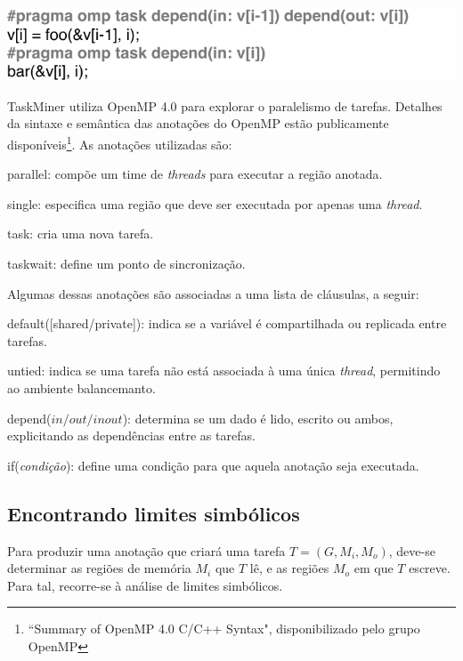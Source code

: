 \documentclass[sigplan,10pt,review]{acmart}
\newcommand\Taskminer{\mbox{\textsf{TaskMiner}}}
\begin{document}
\includegraphics[width=1\columnwidth]{images/ex_depends}

{\Taskminer} utiliza OpenMP 4.0 para explorar o paralelismo de tarefas. Detalhes da sintaxe e semântica
das anotações do OpenMP estão publicamente disponíveis\footnote{``Summary of OpenMP 4.0 C/C++ Syntax", disponibilizado
pelo grupo OpenMP}. As anotações utilizadas são:
%
\begin{compactitem}
\item \textsf{parallel}: compõe um time de \textit{threads}
para executar a região anotada.
\item \textsf{single}: especifica uma região que deve ser executada
por apenas uma \textit{thread}.
\item \textsf{task}: cria uma nova tarefa.
\item \textsf{taskwait}: define um ponto de sincronização.
\end{compactitem}
%
Algumas dessas anotações são associadas a uma lista de cláusulas, a seguir:
\begin{compactitem}
\item \textsf{default([shared/private])}: indica se a variável é compartilhada ou replicada
entre tarefas.
\item \textsf{untied}: indica se uma tarefa não está associada à uma única \textit{thread},
permitindo ao ambiente balancemanto.
\item \textsf{depend}($\mathit{in}/\mathit{out}/\mathit{inout}$): determina se um dado é lido, escrito
ou ambos, explicitando as dependências entre as tarefas.
\item \textsf{if}({\em condição}): define uma condição para que aquela anotação seja executada.
\end{compactitem}

\subsection{Encontrando limites simbólicos}
\label{sec:sra}

Para produzir uma anotação que criará uma tarefa $T = (G, M_i, M_o)$,
deve-se determinar as regiões de memória $M_i$ que $T$ lê, e as regiões
$M_o$ em que $T$ escreve. Para tal, recorre-se à análise de limites simbólicos.
 
\end{document}
